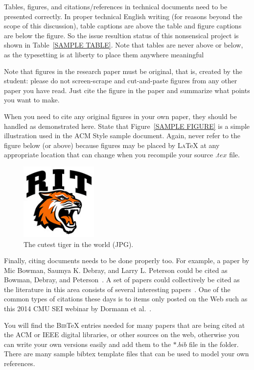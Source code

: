 \documentclass[sigconf, anonymous]{acmart}
\def\BibTeX{\textsc{Bib}\TeX}
\def\LaTeX{\textsc{La}\TeX}
\begin{document}
Tables, figures, and citations/references in technical documents need
to be presented correctly. In proper technical English writing (for
reasons beyond the scope of this discussion), table captions are above
the table and figure captions are below the figure. So the issue
resultion status of this nonsensical project is shown in
Table~\ref{SAMPLE TABLE}. Note that tables are never above or below,
as the typesetting is at liberty to place them anywhere meaningful

Note that figures in the research paper must be original, that is, created
by the student: please do not screen-scrape and cut-and-paste figures
from any other paper you have read. Just cite the figure in the paper
and summarize what points you want to make.

When you need to cite any original figures in your own paper, they
should be handled as demonstrated here. State that Figure~\ref{SAMPLE
  FIGURE} is a simple illustration used in the ACM Style sample
document. Again, never refer to the figure below (or above) because
figures may be placed by \LaTeX{} at any appropriate location that can
change when you recompile your source $.tex$ file.

\begin{figure}[htb]
\begin{center}
\includegraphics[width=1.5in]{rit-tiger-with-text.jpg}
\caption{The cutest tiger in the world (JPG).}
\label{SAMPLE FIGURE}
\end{center}
\end{figure}

Finally, citing documents needs to be done properly too. For example,
a paper by Mic Bowman, Saumya K. Debray, and Larry L. Peterson could
be cited as Bowman, Debray, and Peterson~\cite{bowman:reasoning}. A
set of papers could collectively be cited as the literature in this
area consists of several interesting
papers~\cite{braams:babel,clark:pct,herlihy:methodology}. One of the
common types of citations these days is to items only posted on the
Web such as this 2014 CMU SEI webinar by Dormann et al.~\cite{dormann:API}.

You will find the \BibTeX{} entries needed for many papers that are
being cited at the ACM or IEEE digital libraries, or other sources on
the web, otherwise you can write your own versions easily and add them
to the $*.bib$ file in the folder. There are many sample bibtex
template files that can be used to model your own references.
\end{document}
